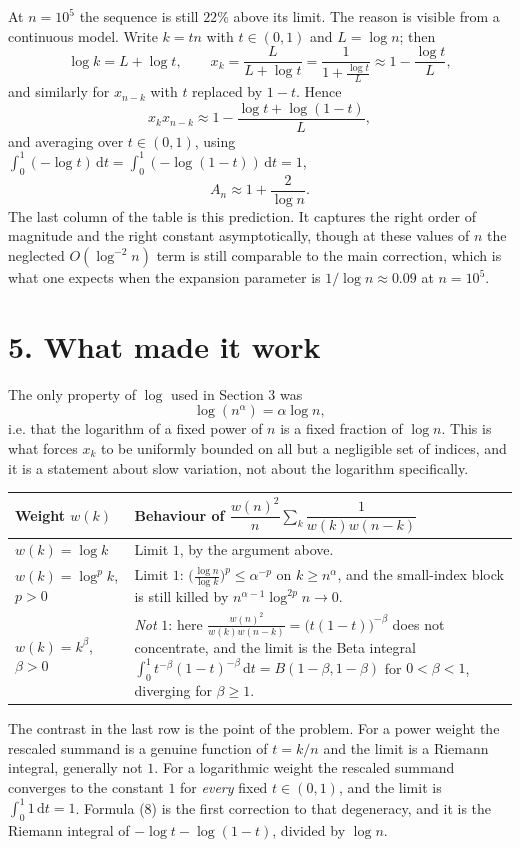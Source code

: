 \documentclass[12pt]{article}
\newcommand{\dd}{\,\mathrm{d}}
\newcommand{\An}{A_n}
\begin{document}
At \(n=10^5\) the sequence is still \(22\%\) above its limit. The reason
is visible from a continuous model. Write \(k=tn\) with \(t\in(0,1)\) and
\(L=\log n\); then
\[
\log k=L+\log t,
\qquad
x_k=\frac{L}{L+\log t}=\frac1{1+\frac{\log t}{L}}
\approx1-\frac{\log t}{L},
\]
and similarly for \(x_{n-k}\) with \(t\) replaced by \(1-t\). Hence
\[
x_kx_{n-k}\approx1-\frac{\log t+\log(1-t)}{L},
\]
and averaging over \(t\in(0,1)\), using
\(\int_0^1(-\log t)\dd t=\int_0^1(-\log(1-t))\dd t=1\),
\[
\boxed{\displaystyle \An\approx1+\frac2{\log n}.}
\tag{8}
\]
The last column of the table is this prediction. It captures the right
order of magnitude and the right constant asymptotically, though at these
values of \(n\) the neglected \(O(\log^{-2}n)\) term is still comparable
to the main correction, which is what one expects when the
expansion parameter is \(1/\log n\approx0.09\) at \(n=10^5\).

\section*{5. What made it work}

The only property of \(\log\) used in Section 3 was
\[
\log(n^{\alpha})=\alpha\log n ,
\tag{9}
\]
i.e. that the logarithm of a fixed power of \(n\) is a fixed fraction of
\(\log n\). This is what forces \(x_k\) to be uniformly bounded on all
but a negligible set of indices, and it is a statement about slow
variation, not about the logarithm specifically.

\begin{center}
\small
\renewcommand{\arraystretch}{1.45}
\begin{tabularx}{\textwidth}{@{}>{\raggedright\arraybackslash}p{}X@{}}
\toprule
Weight \(w(k)\) & Behaviour of \(\dfrac{w(n)^2}{n}\sum_{k}\dfrac1{w(k)w(n-k)}\) \\
\midrule
\(w(k)=\log k\)
& Limit \(1\), by the argument above. \\
\addlinespace
\(w(k)=\log^{p}k\), \(p>0\)
& Limit \(1\): \(\bigl(\frac{\log n}{\log k}\bigr)^{p}\le\alpha^{-p}\) on
\(k\ge n^{\alpha}\), and the small-index block is still killed by
\(n^{\alpha-1}\log^{2p}n\to0\). \\
\addlinespace
\(w(k)=k^{\beta}\), \(\beta>0\)
& \emph{Not} \(1\): here \(\frac{w(n)^2}{w(k)w(n-k)}=\bigl(t(1-t)\bigr)^{-\beta}\)
does not concentrate, and the limit is the Beta integral
\(\int_0^1 t^{-\beta}(1-t)^{-\beta}\dd t=B(1-\beta,1-\beta)\)
for \(0<\beta<1\), diverging for \(\beta\ge1\). \\
\bottomrule
\end{tabularx}
\end{center}

The contrast in the last row is the point of the problem. For a power
weight the rescaled summand is a genuine function of \(t=k/n\) and the
limit is a Riemann integral, generally not \(1\). For a logarithmic
weight the rescaled summand converges to the constant \(1\) for
\emph{every} fixed \(t\in(0,1)\), and the limit is \(\int_0^1 1\dd t=1\).
Formula (8) is the first correction to that degeneracy, and it is the
Riemann integral of \(-\log t-\log(1-t)\), divided by \(\log n\).
\end{document}
